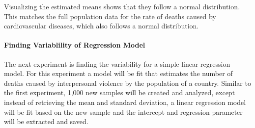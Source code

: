 \documentclass[
  letterpaper,
  DIV=11,
  numbers=noendperiod]{scrartcl}
\let\oldparagraph\paragraph
\renewcommand{\paragraph}[1]{\oldparagraph{#1}\mbox{}}
\newenvironment{Shaded}{\begin{snugshade}}{\end{snugshade}}
\newcommand{\AttributeTok}[1]{\textcolor[rgb]{0.40,0.45,0.13}{#1}}
\newcommand{\CommentTok}[1]{\textcolor[rgb]{0.37,0.37,0.37}{#1}}
\newcommand{\ConstantTok}[1]{\textcolor[rgb]{0.56,0.35,0.01}{#1}}
\newcommand{\ControlFlowTok}[1]{\textcolor[rgb]{0.00,0.23,0.31}{#1}}
\newcommand{\DecValTok}[1]{\textcolor[rgb]{0.68,0.00,0.00}{#1}}
\newcommand{\FunctionTok}[1]{\textcolor[rgb]{0.28,0.35,0.67}{#1}}
\newcommand{\NormalTok}[1]{\textcolor[rgb]{0.00,0.23,0.31}{#1}}
\newcommand{\OtherTok}[1]{\textcolor[rgb]{0.00,0.23,0.31}{#1}}
\newcommand{\SpecialCharTok}[1]{\textcolor[rgb]{0.37,0.37,0.37}{#1}}
\begin{document}
Visualizing the estimated means shows that they follow a normal
distribution. This matches the full population data for the rate of
deaths caused by cardiovascular diseases, which also follows a normal
distribution.

\hypertarget{finding-variablility-of-regression-model}{%
\paragraph{Finding Variablility of Regression
Model}\label{finding-variablility-of-regression-model}}

The next experiment is finding the variability for a simple linear
regression model. For this experiment a model will be fit that estimates
the number of deaths caused by interpersonal violence by the population
of a country. Similar to the first experiment, 1,000 new samples will be
created and analyzed, except instead of retrieving the mean and standard
deviation, a linear regression model will be fit based on the new sample
and the intercept and regression parameter will be extracted and saved.

\begin{Shaded}
\end{Shaded}
\end{document}
